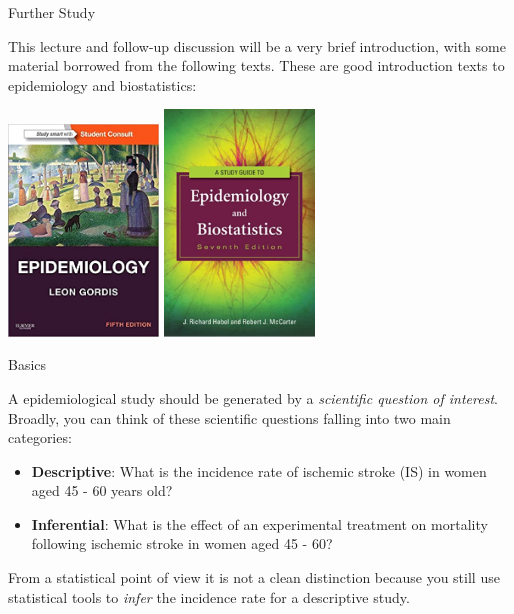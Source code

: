\documentclass[ignorenonframetext,]{beamer}
\providecommand{\tightlist}{%
  \setlength{\itemsep}{0pt}\setlength{\parskip}{0pt}}
\begin{document}
\begin{frame}{Further Study}
\protect\hypertarget{further-study}{}

This lecture and follow-up discussion will be a very brief introduction,
with some material borrowed from the following texts. These are good
introduction texts to epidemiology and biostatistics:

\includegraphics[width=0.3\textwidth,height=\textheight]{../media/gordis.jpg}
\includegraphics[width=0.3\textwidth,height=\textheight]{../media/hebel-carter.jpg}

\end{frame}

\begin{frame}{Basics}
\protect\hypertarget{basics}{}

A epidemiological study should be generated by a \emph{scientific
question of interest}. Broadly, you can think of these scientific
questions falling into two main categories:

\begin{itemize}
\tightlist
\item
  \textbf{Descriptive}: What is the incidence rate of ischemic stroke
  (IS) in women aged 45 - 60 years old?
\item
  \textbf{Inferential}: What is the effect of an experimental treatment
  on mortality following ischemic stroke in women aged 45 - 60?
\end{itemize}

From a statistical point of view it is not a clean distinction because
you still use statistical tools to \emph{infer} the incidence rate for a
descriptive study.

\end{frame}
\end{document}
